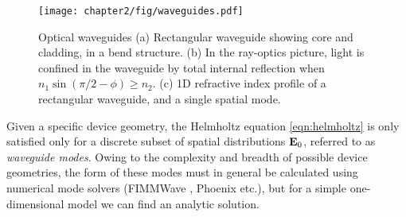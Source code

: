 \begin{figure}[t]
\centering
\texttt{[image: chapter2/fig/waveguides.pdf]}
\caption[Optical waveguides]{Optical waveguides (a) Rectangular waveguide showing core and cladding, in a bend structure. (b) In the ray-optics picture, light is confined in the waveguide by  total internal reflection when $n_1 \sin (\pi/2 - \phi) \ge n_2$. (c) 1D refractive index profile of a rectangular waveguide, and a single spatial mode.}
\label{fig:introduction-waveguides}
\end{figure}


Given a specific device geometry, the Helmholtz equation \ref{eqn:helmholtz} is only satisfied only for a discrete subset of spatial distributions $\mathbf{E}_0$, referred to as \emph{waveguide modes}. Owing to the complexity and breadth of possible device geometries, the form of these modes must in general be calculated using numerical mode solvers (FIMMWave \cite{Fimmwave}, Phoenix \cite{Phoenix} etc.), but for a simple one-dimensional model we can find an analytic solution. 

